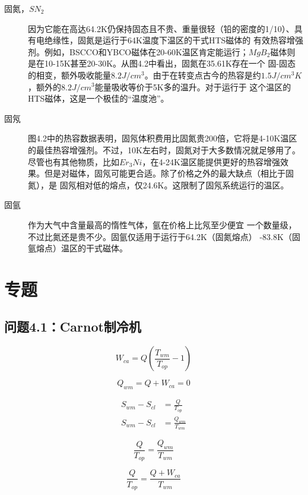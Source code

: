 \begin{description}
  \item[固氮，$SN_2$] 因为它能在高达64.2K仍保持固态且不贵、重量很轻（铅的密度的1/10）、具有电绝缘性，固氮是运行于64K温度下温区的干式HTS磁体的
  有效热容增强剂。例如，BSCCO和YBCO磁体在20-60K温区肯定能运行；$MgB_2$磁体则是在10-15K甚至20-30K。从图4.2中看出，固氮在35.61K存在一个
  固-固态的相变，额外吸收能量$8.2J/cm^3$。由于在转变点古今的热容是约$1.5J/cm^3 K$，额外的$8.2J/cm^3$能量吸收等价于5K多的温升。对于运行于
  这个温区的HTS磁体，这是一个极佳的“温度池”。
  \item[固氖] 图4.2中的热容数据表明，固氖体积费用比固氮贵200倍，它将是4-10K温区的最佳热容增强剂。不过，10K左右时，固氮对于大多数情况就足够用了。
  尽管也有其他物质，比如$Er_3 Ni$，在4-24K温区能提供更好的热容增强效果。但是对磁体，固氖可能更合适。除了价格之外的最大缺点（相比于固氮），是
  固氖相对低的熔点，仅24.6K。这限制了固氖系统运行的温区。
  \item[固氩] 作为大气中含量最高的惰性气体，氩在价格上比氖至少便宜 一个数量级，不过比氮还是贵不少。固氩仅适用于运行于64.2K（固氮熔点）
  -83.8K（固氩熔点）温区的干式磁体。
\end{description}

\section{专题}
\subsection{问题4.1：Carnot制冷机}


\begin{equation}%
W_{ca}=Q(\frac{T_{wm}}{T_{op}}-1)
\end{equation}


\begin{equation*}%
Q_{wm}=Q+W_{ca}=0
\end{equation*}


\begin{align*}%
S_{wm}-S_{cl}&=\frac{Q}{T_{op}}\\
S_{wm}-S_{cl}&=\frac{Q_{wm}}{T_{wm}}
\end{align*}


\begin{equation}%
\frac{Q}{T_{op}}=\frac{Q_{wm}}{T_{wm}}
\end{equation}


\begin{equation*}%
\frac{Q}{T_{op}}=\frac{Q+W_{ca}}{T_{wm}}
\end{equation*}


